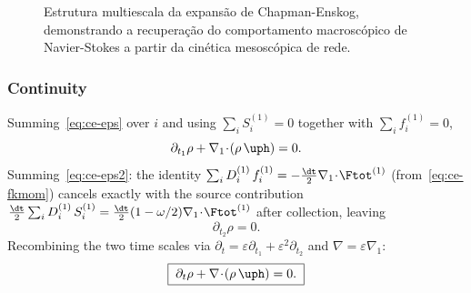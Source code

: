 \begin{figure}[H]
    \centering
    \caption{Estrutura multiescala da expansão de Chapman-Enskog, demonstrando a recuperação do comportamento macroscópico de Navier-Stokes a partir da cinética mesoscópica de rede.}
    \label{fig:chapman-enskog-scales}
\end{figure}

\subsubsection{Continuity}\label{sec:ce-continuity}

Summing~\eqref{eq:ce-eps} over $i$ and using $\sum_i S_i^{(1)} = 0$ together with $\sum_i f_i^{(1)} = 0$,
\begin{equation}
\partial_{t_1}\rho + \nabla_1\!\cdot\!(\rho\,\uph) = 0.
\label{eq:ce-cont1}
\end{equation}
Summing~\eqref{eq:ce-eps2}: the identity $\sum_i D_i^{(1)}\,f_i^{(1)} = -\tfrac{\dt}{2}\nabla_1\!\cdot\!\Ftot^{(1)}$ (from~\eqref{eq:ce-fkmom}) cancels exactly with the source contribution $\tfrac{\dt}{2}\sum_i D_i^{(1)}\,S_i^{(1)} = \tfrac{\dt}{2}(1-\omega/2)\nabla_1\!\cdot\!\Ftot^{(1)}$ after collection, leaving
\begin{equation}
\partial_{t_2}\rho = 0.
\label{eq:ce-cont2}
\end{equation}
Recombining the two time scales via $\partial_t = \varepsilon\partial_{t_1} + \varepsilon^{2}\partial_{t_2}$ and $\nabla = \varepsilon\nabla_1$:
\begin{equation}
\boxed{\;\partial_t\rho + \nabla\!\cdot\!(\rho\,\uph) = 0.\;}
\label{eq:ce-continuity}
\end{equation}

